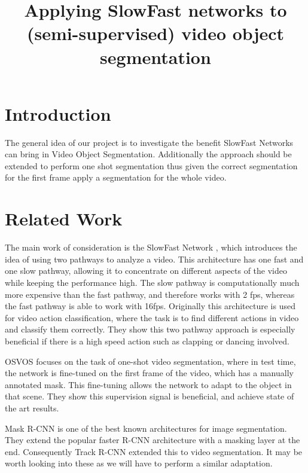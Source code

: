 \documentclass[conference]{IEEEtran}
\begin{document}
\title{Applying SlowFast networks to (semi-supervised) video object segmentation\\
}

\author{
\and
{}
}
\maketitle

\section{Introduction}
The general idea of our project is to investigate the benefit SlowFast Networks \cite{slow_fast} can bring in Video Object Segmentation. Additionally the approach should be extended to perform one shot segmentation thus given the correct segmentation for the first frame apply a segmentation for the whole video. 

\section{Related Work}
The main work of consideration is the SlowFast Network \cite{slow_fast}, which introduces the idea of using two pathways to analyze a video. This architecture has one fast and one slow pathway, allowing it to concentrate on different aspects of the video while keeping the performance high. The slow pathway is computationally much more expensive than the fast pathway, and therefore works with 2 fps, whereas the fast pathway is able to work with 16fps. Originally this architecture is used for video action classification, where the task is to find different actions in video and classify them correctly. They show this two pathway approach is especially beneficial if there is a high speed action such as clapping or dancing involved.  

OSVOS \cite{osvos} focuses on the task of one-shot video segmentation, where in test time, the network is fine-tuned on the first frame of the video, which has a manually annotated mask. This fine-tuning allows the network to adapt to the object in that scene. They show this supervision signal is beneficial, and achieve state of the art results.


Mask R-CNN \cite{mask_rcnn} is one of the best known architectures for image segmentation. They extend the popular faster R-CNN architecture with a masking layer at the end. Consequently Track R-CNN \cite{track_rcnn} extended this to video segmentation. It may be worth looking into these as we will have to perform a similar adaptation.
\end{document}
